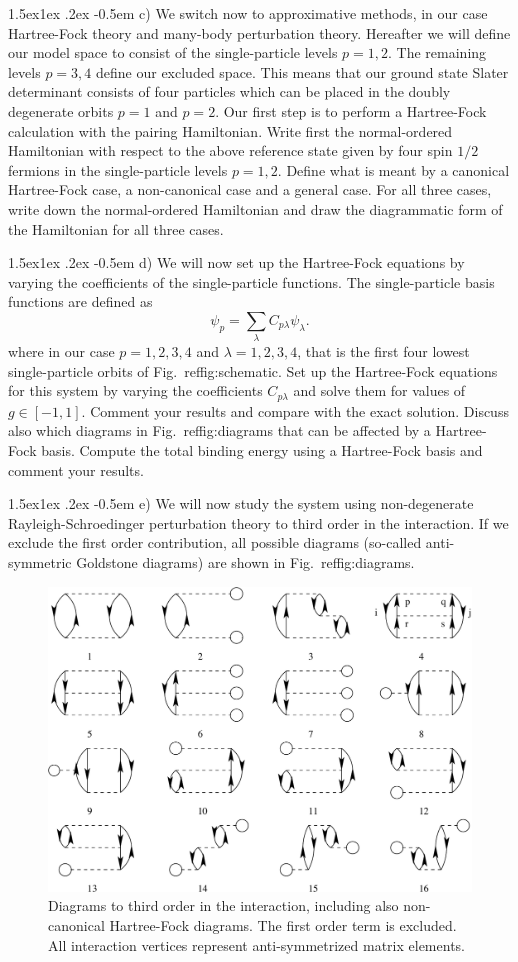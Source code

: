 \documentclass[%
twoside,                 %
final,                   %
10pt]{article}
\makeatletter
\newenvironment{doconceexercise}{}{}
\newcommand\subex{\@startsection{paragraph}{4}{\z@}%
                  {1.5ex\@plus1ex \@minus.2ex}%
                  {-0.5em}%
                  {\normalfont\normalsize\bfseries}}
\makeatother
\begin{document}
\begin{doconceexercise}
\subex{c)}
We switch now to approximative methods, in our case Hartree-Fock
  theory and many-body perturbation theory. Hereafter we will define
  our model space to consist of the single-particle levels $p=1,2$.
  The remaining levels $p=3,4$ define our excluded space.  This means
  that our ground state Slater determinant consists of four particles
  which can be placed in the doubly degenerate orbits $p=1$ and $p=2$.
  Our first step is to perform a Hartree-Fock calculation with the
  pairing Hamiltonian.  Write first the normal-ordered Hamiltonian
  with respect to the above reference state given by four spin $1/2$
  fermions in the single-particle levels $p=1,2$. Define what is meant
  by a canonical Hartree-Fock case, a non-canonical case and a general
  case.  For all three cases, write down the normal-ordered
  Hamiltonian and draw the diagrammatic form of the Hamiltonian for all three cases.



\subex{d)}
We will now set up the Hartree-Fock equations by varying the
coefficients of the single-particle functions. The single-particle
basis functions are defined as
\[
\psi_p = \sum_{\lambda} C_{p\lambda}\psi_{\lambda}.
\]
where in our case $p=1,2,3,4$ and $\lambda=1,2,3,4$, that is the first
four lowest single-particle orbits of Fig.~ref{fig:schematic}.  Set
up the Hartree-Fock equations for this system by varying the
coefficients $C_{p\lambda}$ and solve them for values of $g\in
[-1,1]$.  Comment your results and compare with the exact
solution. Discuss also which diagrams in Fig.~ref{fig:diagrams} that
can be affected by a Hartree-Fock basis. Compute the total binding
energy using a Hartree-Fock basis and comment your results.



\subex{e)}
We will now study the system using non-degenerate
Rayleigh-Schroedinger perturbation theory to third order in the
interaction.  If we exclude the first order contribution, all possible
diagrams (so-called anti-symmetric Goldstone diagrams) are
shown in Fig.~ref{fig:diagrams}.


\begin{figure}[t]
  \centerline{\includegraphics[width=0.6\linewidth]{fig-proj/diagrams.pdf}}
  \caption{
  Diagrams to third order in the interaction, including also non-canonical Hartree-Fock diagrams. The first order term is excluded. All interaction vertices represent anti-symmetrized matrix elements. \label{fig:diagrams}
  }
\end{figure}



\end{doconceexercise}
\end{document}
